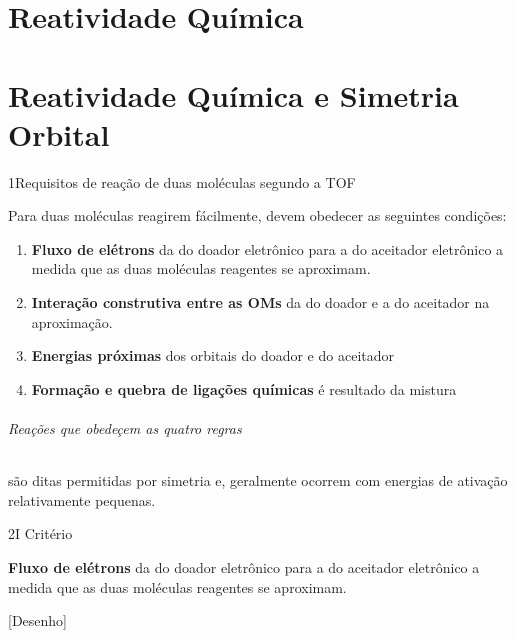 
\setcounter{part}{20}
\part{Reatividade Química}

\part*{Reatividade Química e Simetria Orbital}

\begin{sectionBox}1{Requisitos de reação de duas moléculas segundo a TOF}
    
    Para duas moléculas reagirem fácilmente, devem obedecer as seguintes condições:
    \begin{enumerate}[label = \Roman*]
        \item \textbf{Fluxo de elétrons} da \HOMO{} do doador eletrônico para a \LUMO{} do aceitador eletrônico a medida que as duas moléculas reagentes se aproximam.
        \item \textbf{Interação construtiva entre as OMs} da \HOMO{} do doador e a \LUMO{} do aceitador na aproximação.
        \item \textbf{Energias próximas} dos orbitais \HOMO{} do doador e \LUMO{} do aceitador
        \item \textbf{Formação e quebra de ligações químicas} é resultado da mistura \HOMO{}\rightarrow\LUMO{}
    \end{enumerate}
    
    \paragraph{Reações que obedeçem as quatro regras} são ditas \textcolor{Emph}{permitidas por simetria} e, geralmente ocorrem com energias de ativação relativamente pequenas.

\end{sectionBox}

\begin{sectionBox}2{I Critério}
    

    \textbf{Fluxo de elétrons} da \HOMO{} do doador eletrônico para a \LUMO{} do aceitador eletrônico a medida que as duas moléculas reagentes se aproximam.

    [Desenho]
    
\end{sectionBox}

